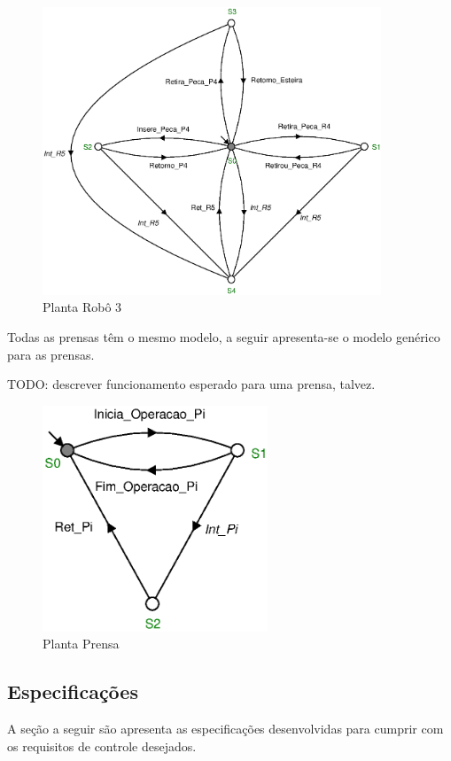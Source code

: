 \begin{figure}[H]%
    \centering
    \includegraphics[width=0.9\textwidth]{imagens/robo_5.eps}
    \caption{Planta Robô 3}\label{fig:robo5}
\end{figure}

Todas as prensas têm o mesmo modelo, a seguir apresenta-se o modelo genérico para as prensas.

TODO: descrever funcionamento esperado para uma prensa, talvez.

\begin{figure}[H]%
    \centering
    \includegraphics[width=0.6\textwidth]{imagens/Prensa.eps}
    \caption{Planta Prensa}\label{fig:prensa}
\end{figure}

\subsection{Especificações}
A seção a seguir são apresenta as especificações desenvolvidas para cumprir com os requisitos de controle desejados.

